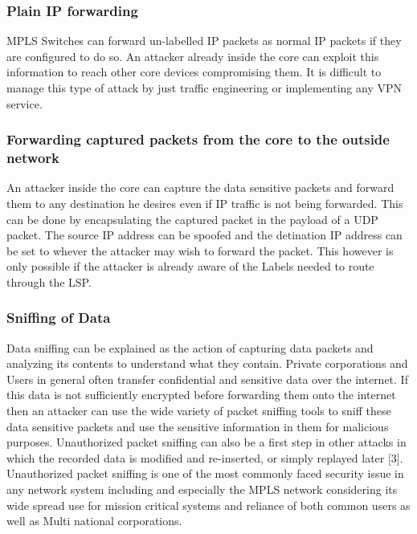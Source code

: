 \subsubsection{Plain IP forwarding}
MPLS Switches can forward un-labelled IP packets as normal IP packets if they are configured to do so. An attacker already inside the core can exploit this information to reach other core devices compromising them. It is difficult to manage this type of attack by just traffic engineering or implementing any VPN service.

\subsubsection{Forwarding captured packets from the core to the outside network}
An attacker inside the core can capture the data sensitive packets and forward them to any destination he desires even if IP traffic is not being forwarded. This can be done by encapsulating the captured packet in the payload of a UDP packet. The source IP address can be spoofed and the detination  IP address can be set to whever the attacker may wish to forward the packet. This however is only possible if the attacker is already aware of the Labels needed to route through the LSP.

\subsubsection{Sniffing of Data}
Data sniffing can be explained as the action of capturing data packets and analyzing its contents to understand what they contain. Private corporations and Users in general often transfer confidential and sensitive data over the internet. If this data is not sufficiently encrypted before forwarding them onto the internet then an attacker can use the wide variety of packet sniffing tools to sniff these data sensitive packets and use the sensitive information in them for malicious purposes. Unauthorized packet sniffing can also be a first step in other attacks in which the recorded data is modified and re-inserted, or simply replayed later [3]. Unauthorized packet sniffing is one of the most commonly faced security issue in any network system including and especially the MPLS network considering its wide spread use for mission critical systems and reliance of both common users as well as Multi national corporations.

